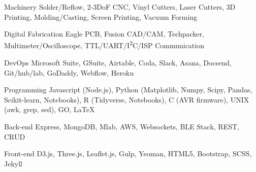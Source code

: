 

\begin{cvskills}

  \cvskill
    {Machinery} %
    {Solder/Reflow, 2-3DoF CNC, Vinyl Cutters, Laser Cutters, 3D Printing, Molding/Casting, Screen Printing, Vacuum Forming} %

  \cvskill
    {Digital Fabrication} %
    {Eagle PCB, Fusion CAD/CAM, Techpacker, Multimeter/Oscilloscope, TTL/UART/I\textsuperscript{2}C/ISP Communication} %

  \cvskill
    {DevOps} %
    {Microsoft Suite, GSuite, Airtable, Coda, Slack, Asana, Docsend, Git/hub/lab, GoDaddy, Webflow, Heroku} %

  \cvskill
    {Programming} %
    {Javascript (Node.js), Python (Matplotlib, Numpy, Scipy, Pandas, Scikit-learn, Notebooks), R (Tidyverse, Notebooks), C (AVR firmware), UNIX (awk, grep, sed), GO, LaTeX} %

  \cvskill
    {Back-end} %
    {Express, MongoDB, Mlab, AWS, Websockets, BLE Stack, REST, CRUD} %

  \cvskill
    {Front-end} %
    {D3.js, Three.js, Leaflet.js, Gulp, Yeoman, HTML5, Bootstrap, SCSS, Jekyll} %

\end{cvskills}
